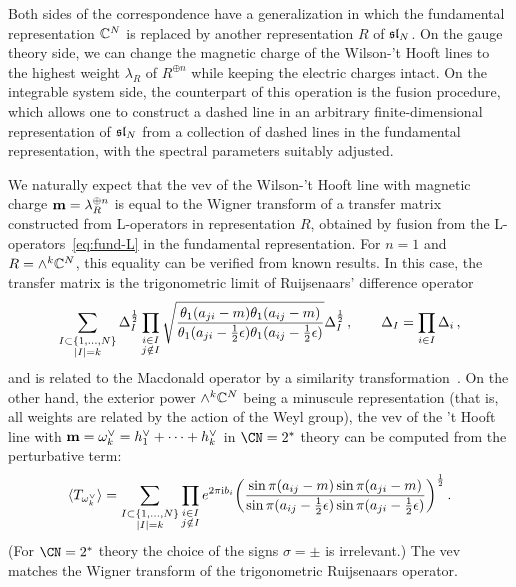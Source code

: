 Both sides of the correspondence have a generalization in which the
fundamental representation $\mathbb{C}^N$ is replaced by another representation $R$
of $\mathfrak{sl}_N$.  On the gauge theory side, we can change the magnetic
charge of the Wilson-'t Hooft lines to the highest weight $\lambda_R$
of $R^{\oplus n}$ while keeping the electric charges intact.  On the
integrable system side, the counterpart of this operation is the
fusion procedure, which allows one to construct a dashed line in an
arbitrary finite-dimensional representation of $\mathfrak{sl}_N$ from a
collection of dashed lines in the fundamental representation, with the
spectral parameters suitably adjusted.

We naturally expect that the vev of the Wilson-'t Hooft line with
magnetic charge $\mathbf{m} = \lambda_R^{\oplus n}$ is equal to the
Wigner transform of a transfer matrix constructed from L-operators in
representation $R$, obtained by fusion from the
L-operators~\eqref{eq:fund-L} in the fundamental representation.
For $n = 1$ and $R = \wedge^k \mathbb{C}^N$, this equality can be verified
from known results.  In this case, the transfer matrix is the
trigonometric limit of Ruijsenaars' difference
operator~\cite{Ruijsenaars:1986pp}
\begin{equation}
  \sum_{\substack{I \subset \{1, \dotsc, N\} \\ |I| = k}}
  \Delta_I^{\frac12}
  \prod_{\substack{i \in I \\ j \notin I}}
  \sqrt{
    \frac{\theta_1(a_{ji} - m) \theta_1(a_{ij} - m)}
          {\theta_1(a_{ji} - \frac12 \epsilon) \theta_1(a_{ij} - \frac12 \epsilon)}
  }
  \Delta_I^{\frac12} \,,
  \qquad
  \Delta_I = \prod_{i \in I} \Delta_i \,,
\end{equation}
and is related to the Macdonald operator by a similarity
transformation~\cite{MR1463830}.  On the other hand, the exterior
power $\wedge^k \mathbb{C}^N$ being a minuscule representation (that is, all
weights are related by the action of the Weyl group), the vev of the
't Hooft line with
$\mathbf{m} = \omega^\vee_k = h^\vee_1 + \dotsb + h^\vee_k$ in
$\CN = 2^*$ theory can be computed from the perturbative term:
\begin{equation}
  \langle T_{\omega^\vee_k} \rangle
  =
  \sum_{\substack{I \subset \{1, \dotsc, N\} \\ |I| = k}}
  \prod_{\substack{i \in I \\ j \notin I}}
  e^{2\pi\mathrm{i} b_i}
  \biggl(
  \frac{\sin\pi(a_{ij} - m) \sin\pi(a_{ji} - m)}
        {\sin\pi(a_{ij} - \frac12\epsilon) \sin\pi(a_{ji} - \frac12\epsilon)}
  \biggr)^{\frac12} \,.
\end{equation}
(For $\CN = 2^*$ theory the choice of the signs $\sigma = \pm$ is
irrelevant.)  The vev matches the Wigner transform of the
trigonometric Ruijsenaars operator.

